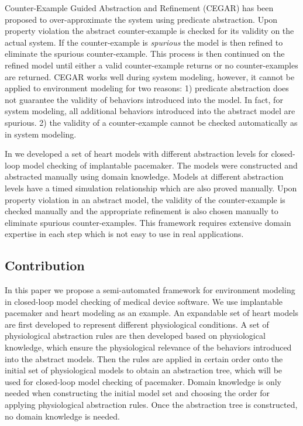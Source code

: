 Counter-Example Guided Abstraction and Refinement (CEGAR) \cite{CEGAR} has been proposed to over-approximate the system using predicate abstraction. Upon property violation the abstract counter-example is checked for its validity on the actual system. If the counter-example is \emph{spurious} the model is then refined to eliminate the spurious counter-example. This process is then continued on the refined model until either a valid counter-example returns or no counter-examples are returned. CEGAR works well during system modeling, however, it cannot be applied to environment modeling for two reasons: 1) predicate abstraction does not guarantee the validity of behaviors introduced into the model. In fact, for system modeling, all additional behaviors introduced into the abstract model are spurious. 2) the validity of a counter-example cannot be checked automatically as in system modeling.

In \cite{sttt13} we developed a set of heart models with different abstraction levels for closed-loop model checking of implantable pacemaker. The models were constructed and abstracted manually using domain knowledge. Models at different abstraction levels have a timed simulation relationship which are also proved manually. Upon property violation in an abstract model, the validity of the counter-example is checked manually and the appropriate refinement is also chosen manually to eliminate spurious counter-examples. This framework requires extensive domain expertise in each step which is not easy to use in real applications.

\subsection{Contribution}
In this paper we propose a semi-automated framework for environment modeling in closed-loop model checking of medical device software. We use implantable pacemaker and heart modeling as an example. An expandable set of heart models are first developed to represent different physiological conditions. A set of physiological abstraction rules are then developed based on physiological knowledge, which ensure the physiological relevance of the behaviors introduced into the abstract models. Then the rules are applied in certain order onto the initial set of physiological models to obtain an abstraction tree, which will be used for closed-loop model checking of pacemaker. Domain knowledge is only needed when constructing the initial model set and choosing the order for applying physiological abstraction rules. Once the abstraction tree is constructed, no domain knowledge is needed. 

